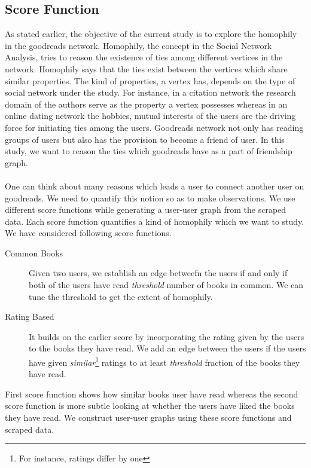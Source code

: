 \documentclass[11pt]{article}
\begin{document}
\subsection{Score Function}
As stated earlier, the objective of the current study is to explore the homophily in the goodreads network. Homophily, the concept in the Social Network Analysis, tries to reason the existence of ties among different vertices in the network. Homophily says that the ties exist between the vertices which share similar properties. The kind of properties, a vertex has, depends on the type of social network under the study. For instance, in a citation network the research domain of the authors serve as the property a vertex possesses whereas in an online dating network the hobbies, mutual interests of the users are the driving force for initiating ties among the users. Goodreads network not only has reading groups of users but also has the provision to become a friend of user. In this study, we want to reason the ties which goodreads have as a part of friendship graph.\\\\
One can think about many reasons which leads a user to connect another user on goodreads. We need to quantify this notion so as to make observations. We use different score functions while generating a user-user graph from the scraped data. Each score function quantifies a kind of homophily which we want to study. We have considered following score functions.
\begin{description}
	\item[Common Books] Given two users, we establish an edge betweefn the users if and only if both of the users have read {\it threshold} number of books in common. We can tune the threshold to get the extent of homophily.
    \item[Rating Based] It builds on the earlier score by incorporating the rating given by the users to the books they have read. We add an edge between the users if the users have given {\it similar}\footnote{For instance, ratings differ by one} ratings to at least {\it threshold} fraction of the books they have read.
\end{description}
First score function shows how similar books user have read whereas the second score function is more subtle looking at whether the users have liked the books they have read. We construct user-user graphs using these score functions and scraped data.
\end{document}
